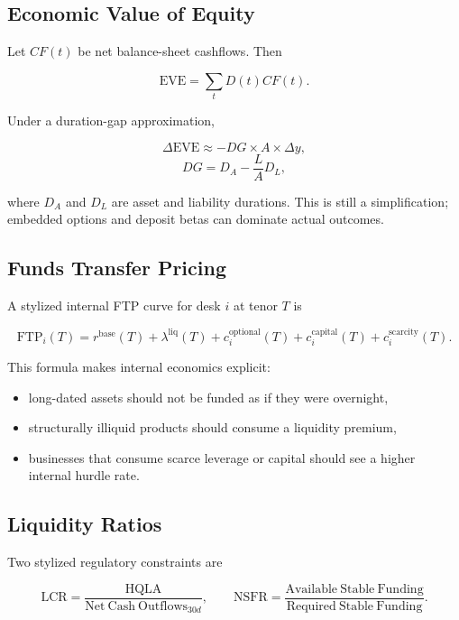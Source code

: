 \documentclass{apex_mdd}
\begin{document}
\subsection{Economic Value of Equity}

Let $CF(t)$ be net balance-sheet cashflows. Then
\begin{formulabox}
\[
  \mathrm{EVE} = \sum_t D(t)CF(t).
\]
\end{formulabox}

Under a duration-gap approximation,
\begin{formulabox}
\[
  \Delta \mathrm{EVE}
  \approx
  -DG \times A \times \Delta y,
\]
\[
  DG = D_A - \frac{L}{A}D_L,
\]
\end{formulabox}
where $D_A$ and $D_L$ are asset and liability durations. This is still a simplification; embedded options and deposit betas can dominate actual outcomes.

\subsection{Funds Transfer Pricing}

A stylized internal FTP curve for desk $i$ at tenor $T$ is
\begin{formulabox}
\[
  \mathrm{FTP}_i(T)
  =
  r^{\mathrm{base}}(T)
  + \lambda^{\mathrm{liq}}(T)
  + c_i^{\mathrm{optional}}(T)
  + c_i^{\mathrm{capital}}(T)
  + c_i^{\mathrm{scarcity}}(T).
\]
\end{formulabox}

This formula makes internal economics explicit:
\begin{itemize}
  \item long-dated assets should not be funded as if they were overnight,
  \item structurally illiquid products should consume a liquidity premium,
  \item businesses that consume scarce leverage or capital should see a higher internal hurdle rate.
\end{itemize}

\subsection{Liquidity Ratios}

Two stylized regulatory constraints are
\begin{formulabox}
\[
  \mathrm{LCR}
  =
  \frac{\mathrm{HQLA}}{\mathrm{Net\ Cash\ Outflows}_{30d}},
  \qquad
  \mathrm{NSFR}
  =
  \frac{\mathrm{Available\ Stable\ Funding}}{\mathrm{Required\ Stable\ Funding}}.
\]
\end{formulabox}
\end{document}
